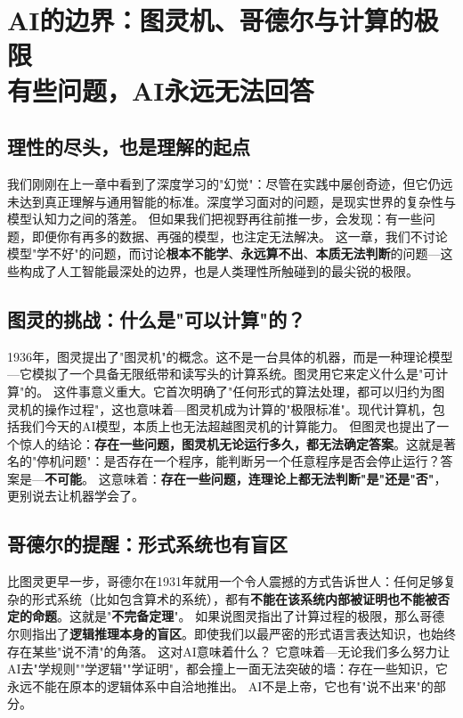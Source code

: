  \chapter{AI的边界：图灵机、哥德尔与计算的极限 \texorpdfstring{\\}{ }有些问题，AI永远无法回答}
\section*{理性的尽头，也是理解的起点}

我们刚刚在上一章中看到了深度学习的"幻觉"：尽管在实践中屡创奇迹，但它仍远未达到真正理解与通用智能的标准。深度学习面对的问题，是现实世界的复杂性与模型认知力之间的落差。
但如果我们把视野再往前推一步，会发现：有一些问题，即便你有再多的数据、再强的模型，也注定无法解决。
这一章，我们不讨论模型"学不好"的问题，而讨论\textbf{根本不能学}、\textbf{永远算不出}、\textbf{本质无法判断}的问题---这些构成了人工智能最深处的边界，也是人类理性所触碰到的最尖锐的极限。
\section*{图灵的挑战：什么是"可以计算"的？}

1936年，图灵提出了"图灵机"的概念。这不是一台具体的机器，而是一种理论模型---它模拟了一个具备无限纸带和读写头的计算系统。图灵用它来定义什么是"可计算"的。
这件事意义重大。它首次明确了"任何形式的算法处理，都可以归约为图灵机的操作过程"，这也意味着---图灵机成为计算的"极限标准"。现代计算机，包括我们今天的AI模型，本质上也无法超越图灵机的计算能力。
但图灵也提出了一个惊人的结论：\textbf{存在一些问题，图灵机无论运行多久，都无法确定答案}。这就是著名的"停机问题"：是否存在一个程序，能判断另一个任意程序是否会停止运行？答案是---\textbf{不可能}。
这意味着：\textbf{存在一些问题，连理论上都无法判断"是"还是"否"}，更别说去让机器学会了。

\section*{哥德尔的提醒：形式系统也有盲区}

比图灵更早一步，哥德尔在1931年就用一个令人震撼的方式告诉世人：任何足够复杂的形式系统（比如包含算术的系统），都有\textbf{不能在该系统内部被证明也不能被否定的命题}。这就是"\textbf{不完备定理}"。
如果说图灵指出了计算过程的极限，那么哥德尔则指出了\textbf{逻辑推理本身的盲区}。即使我们以最严密的形式语言表达知识，也始终存在某些"说不清"的角落。
这对AI意味着什么？
它意味着---无论我们多么努力让AI去"学规则""学逻辑""学证明"，都会撞上一面无法突破的墙：存在一些知识，它永远不能在原本的逻辑体系中自洽地推出。
AI不是上帝，它也有"说不出来"的部分。


